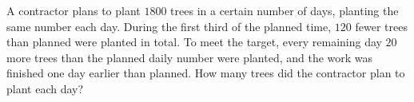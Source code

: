 A contractor plans to plant $1800$ trees in a certain number of days, planting the same number each day. During the first third of the planned time, $120$ fewer trees than planned were planted in total. To meet the target, every remaining day $20$ more trees than the planned daily number were planted, and the work was finished one day earlier than planned. How many trees did the contractor plan to plant each day?
